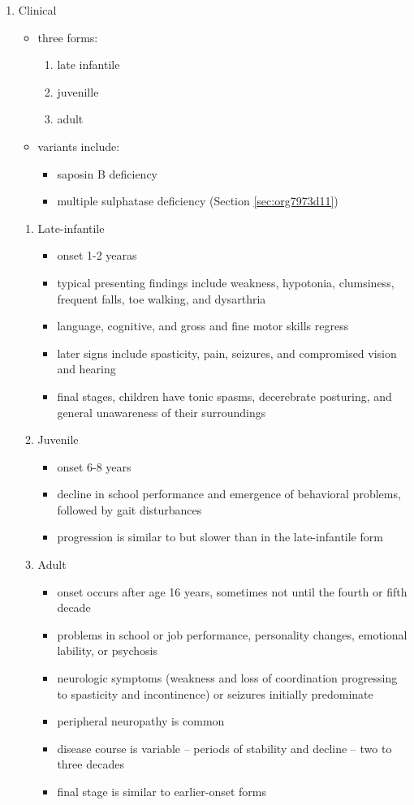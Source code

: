 \documentclass{scrartcl}
\begin{document}
\begin{enumerate}
\item Clinical
\label{sec:org74c916b}
\begin{itemize}
\item three forms:
\begin{enumerate}
\item late infantile
\item juvenille
\item adult
\end{enumerate}
\item variants include:
\begin{itemize}
\item saposin B deficiency
\item multiple sulphatase deficiency (Section \ref{sec:org7973d11})
\end{itemize}
\end{itemize}
\begin{enumerate}
\item Late-infantile
\label{sec:org0a0591f}
\begin{itemize}
\item onset 1-2 yearas
\item typical presenting findings include weakness, hypotonia, clumsiness, frequent falls, toe walking, and dysarthria
\item language, cognitive, and gross and fine motor skills regress
\item later signs include spasticity, pain, seizures, and compromised vision and hearing
\item final stages, children have tonic spasms, decerebrate posturing, and
general unawareness of their surroundings
\end{itemize}

\item Juvenile
\label{sec:org5f4a236}
\begin{itemize}
\item onset 6-8 years
\item decline in school performance and emergence of behavioral problems, followed by gait disturbances
\item progression is similar to but slower than in the late-infantile form
\end{itemize}

\item Adult
\label{sec:org2dcbe65}
\begin{itemize}
\item onset occurs after age 16 years, sometimes not until the fourth or fifth decade
\item problems in school or job performance, personality changes, emotional lability, or psychosis
\item neurologic symptoms (weakness and loss of coordination progressing
to spasticity and incontinence) or seizures initially
predominate
\item peripheral neuropathy is common
\item disease course is variable – periods of stability and decline – two to three decades
\item final stage is similar to earlier-onset forms
\end{itemize}
\end{enumerate}


\end{enumerate}
\end{document}
